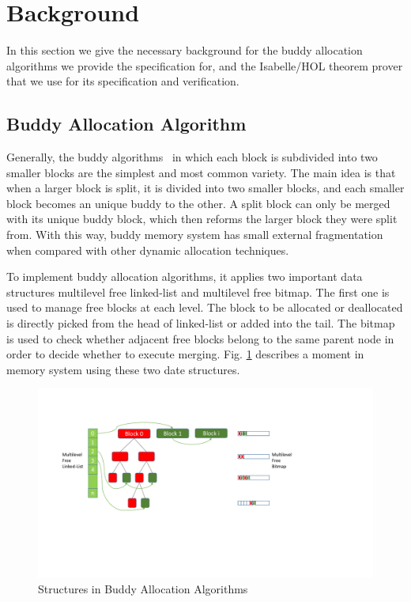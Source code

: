 \section{Background}
In this section we give the necessary background for the buddy allocation algorithms we provide the specification for, and the Isabelle/HOL theorem prover that we use for its specification and verification.

\subsection{Buddy Allocation Algorithm}
Generally, the buddy algorithms~\cite{reg_knowlton} in which each block is subdivided into two smaller blocks are the simplest and most common variety. The main idea is that when a larger block is split, it is divided into two smaller blocks, and each smaller block becomes an unique buddy to the other. A split block can only be merged with its unique buddy block, which then reforms the larger block they were split from. With this way, buddy memory system has small external fragmentation when compared with other dynamic allocation techniques.

To implement buddy allocation algorithms, it applies two important data structures multilevel free linked-list and multilevel free bitmap. The first one is used to manage free blocks at each level. The block to be allocated or deallocated is directly picked from the head of linked-list or added into the tail. The bitmap is used to check whether adjacent free blocks belong to the same parent node in order to decide whether to execute merging. Fig. \ref{fig3} describes a moment in memory system using these two date structures.

\begin{figure}
	\centering
	\includegraphics[width=1\textwidth]{fig3.pdf}
	\caption{Structures in Buddy Allocation Algorithms}
	\label{fig3}
\end{figure}

